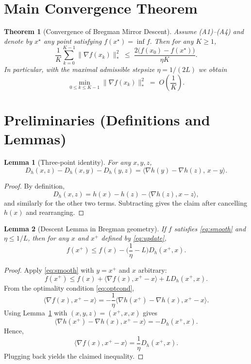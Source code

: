 \documentclass{article}
\newtheorem{theorem}{Theorem}
\newtheorem{lemma}{Lemma}
\newcommand{\breg}[2]{D_h(#1,#2)}
\begin{document}
\section*{Main Convergence Theorem}
\begin{theorem}[Convergence of Bregman Mirror Descent]\label{thm:main}
Assume (A1)–(A4) and denote by $x^\star$ any point satisfying $f(x^\star)=\inf f$.  Then for any $K\ge1$,
\[
\frac{1}{K}\sum_{k=0}^{K-1}\|\nabla f(x_k)\|_{*}^{2}
\;\le\;
\frac{2\big(f(x_0)-f(x^\star)\big)}{\eta K}.
\]
In particular, with the maximal admissible stepsize $\eta=1/(2L)$ we obtain
\[
\min_{0\le k\le K-1}\|\nabla f(x_k)\|_{*}^{2}
\;=\;O\!\left(\frac{1}{K}\right).
\]
\end{theorem}

\section*{Preliminaries (Definitions and Lemmas)}
\begin{lemma}[Three‑point identity]\label{lem:three}
For any $x,y,z$,
\[
\breg{x}{z}-\breg{x}{y}-\breg{y}{z}
=
\langle\nabla h(y)-\nabla h(z),\,x-y\rangle .
\]
\end{lemma}
\begin{proof}
By definition,
\[
\breg{x}{z}=h(x)-h(z)-\langle\nabla h(z),x-z\rangle,
\]
and similarly for the other two terms. Subtracting gives the claim after cancelling $h(x)$ and rearranging. \hfill\qedsymbol
\end{proof}

\begin{lemma}[Descent Lemma in Bregman geometry]\label{lem:descent}
If $f$ satisfies \eqref{eq:smooth} and $\eta\le 1/L$, then for any $x$ and $x^{+}$ defined by \eqref{eq:update},
\[
f(x^{+})\le f(x)-\Big(\frac{1}{\eta}-L\Big)\breg{x^{+}}{x}.
\]
\end{lemma}
\begin{proof}
Apply \eqref{eq:smooth} with $y=x^{+}$ and $x$ arbitrary:
\[
f(x^{+})\le f(x)+\langle\nabla f(x),x^{+}-x\rangle+L\breg{x^{+}}{x}.
\]
From the optimality condition \eqref{eq:optcond},
\[
\langle\nabla f(x),x^{+}-x\rangle
= -\frac{1}{\eta}\langle\nabla h(x^{+})-\nabla h(x),x^{+}-x\rangle.
\]
Using Lemma~\ref{lem:three} with $(x,y,z)=(x^{+},x,x)$ gives
\[
\langle\nabla h(x^{+})-\nabla h(x),x^{+}-x\rangle
= -\breg{x^{+}}{x}.
\]
Hence,
\[
\langle\nabla f(x),x^{+}-x\rangle = \frac{1}{\eta}\breg{x^{+}}{x}.
\]
Plugging back yields the claimed inequality. \hfill\qedsymbol
\end{proof}
\end{document}
